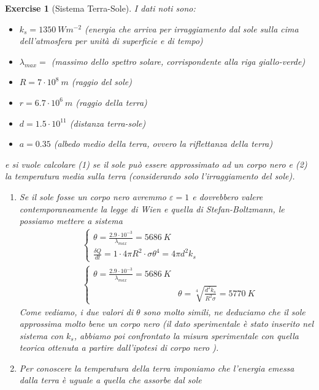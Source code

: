 \documentclass[10pt,a4paper]{article}
\newtheorem{exercise}{Exercise}
\begin{document}
\begin{exercise}[Sistema Terra-Sole]
I dati noti sono:
\begin{itemize}
	\item $k_s = 1350\ W m^{-2}$  (energia che arriva per irraggiamento dal sole sulla cima dell'atmosfera per unità di superficie e di tempo)
	\item $\lambda_{max} = $      (massimo dello spettro solare, corrispondente alla riga giallo-verde)
	\item $R = 7\cdot 10^8\ m$ (raggio del sole)
	\item $r = 6.7\cdot 10^6\ m$ (raggio della terra)
	\item $d = 1.5 \cdot 10^{11}$ (distanza terra-sole)
	\item $a = 0.35 $ (albedo medio della terra, ovvero la riflettanza della terra)
\end{itemize}
e si vuole calcolare (1) se il sole può essere approssimato ad un corpo nero e (2) la temperatura media sulla terra (considerando solo l'irraggiamento del sole).\\
\begin{enumerate}
	\item  Se il sole fosse un corpo nero avremmo $\varepsilon = 1$ e dovrebbero valere contemporaneamente la legge di Wien e quella di Stefan-Boltzmann, le possiamo mettere a sistema
	\begin{align*}
		&\begin{cases}
			\theta = \frac{2.9 \cdot 10^{-3}}{\lambda_{max}} = 5686\ K\\
			\frac{\delta Q}{dt} = 1 \cdot 4\pi R^2\cdot \sigma \theta^4 = 4\pi d^2 k_s
		\end{cases}\\
	&\begin{cases}
		\theta = \frac{2.9 \cdot 10^{-3}}{\lambda_{max}} = 5686\ K\\
		&\theta = \sqrt[4]{\frac{d^2 k_s}{R^2 \sigma}} = 5770\ K
	\end{cases}
	\end{align*}
	Come vediamo, i due valori di $\theta$ sono molto simili, ne deduciamo che il sole approssima molto bene un corpo nero (il dato sperimentale è stato inserito nel sistema con \(k_s\), abbiamo poi confrontato la misura sperimentale con quella teorica ottenuta a partire dall'ipotesi di corpo nero ). 
	\item Per conoscere la temperatura della terra imponiamo che l'energia emessa dalla terra è uguale a quella che assorbe dal sole
	\begin{align*}

\end{align*}
\end{enumerate}
\end{exercise}
\end{document}

